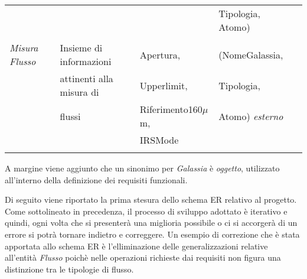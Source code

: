 \documentclass[12pt,a4paper,onecolumn,x11names]{article}
\begin{document}
\begin{table}[h!]
\begin{tabular}{lllll}
												&								&							& Tipologia, Atomo)\\
												&								&							&					\\
				\textit{Misura Flusso}			& Insieme di informazioni		&	Apertura,				& (NomeGalassia,	\\
												& attinenti alla misura di		&	Upperlimit,				&  Tipologia,	\\		
												& flussi						&	Riferimento160$\mu$m,	&	Atomo) \textit{esterno}	\\
												&								&	IRSMode					&							  \\
												&								&							&					\\
			\end{tabular}
		\end{table}
	
		\begin{flushleft}
			A margine viene aggiunto che un sinonimo per \textit{Galassia} è \textit{oggetto}, utilizzato all'interno della definizione dei requisiti funzionali.
			
			Di seguito viene riportato la prima stesura dello schema ER relativo al progetto. Come sottolineato in precedenza, il processo di sviluppo adottato è iterativo e quindi, ogni volta che si presenterà una miglioria possibile o ci si accorgerà di un errore si potrà tornare indietro e correggere.\newline
			Un esempio di correzione che è stata apportata allo schema ER è l'elliminazione delle generalizzazioni relative all'entità \textit{Flusso} poichè nelle operazioni richieste dai requisiti non figura una distinzione tra le tipologie di flusso.
		\end{flushleft}
\end{document}

